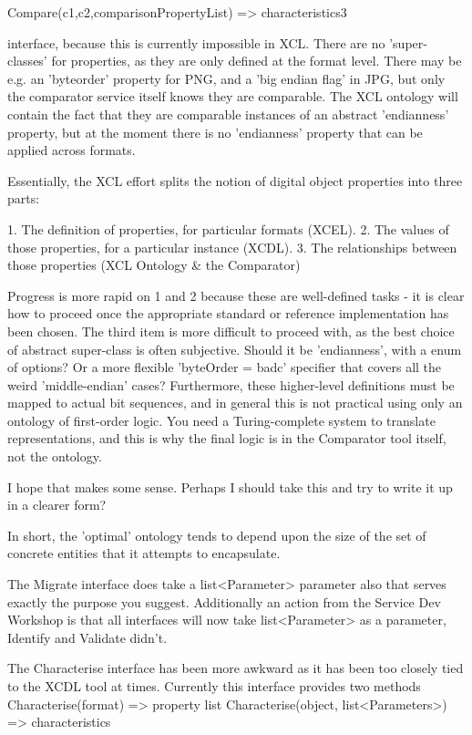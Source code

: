 \documentclass{article}
\begin{document}
Compare(c1,c2,comparisonPropertyList) => characteristics3

interface, because this is currently impossible in XCL.  There are no
'super-classes' for properties, as they are only defined at the format level.
There may be e.g. an 'byteorder' property for PNG, and a 'big endian flag' in
JPG, but only the comparator service itself knows they are comparable.  The XCL
ontology will contain the fact that they are comparable instances of an abstract
'endianness' property, but at the moment there is no 'endianness' property that
can be applied across formats.

Essentially, the XCL effort splits the notion of digital object properties into
three parts:

1. The definition of properties, for particular formats (XCEL). 2. The values of
those properties, for a particular instance (XCDL). 3. The relationships between
those properties (XCL Ontology \& the Comparator)

Progress is more rapid on 1 and 2 because these are well-defined tasks - it is
clear how to proceed once the appropriate standard or reference implementation
has been chosen.  The third item is more difficult to proceed with, as the best
choice of abstract super-class is often subjective.  Should it be 'endianness',
with a enum of options?  Or a more flexible 'byteOrder = badc' specifier that
covers all the weird 'middle-endian' cases?  Furthermore, these higher-level
definitions must be mapped to actual bit sequences, and in general this is not
practical using only an ontology of first-order logic.  You need a
Turing-complete system to translate representations, and this is why the final
logic is in the Comparator tool itself, not the ontology.

I hope that makes some sense.  Perhaps I should take this and try to write it up
in a clearer form?

In short, the 'optimal' ontology tends to depend upon the size of the set of
concrete entities that it attempts to encapsulate.





The Migrate interface does take a list<Parameter> parameter also that serves
exactly the purpose you suggest.  Additionally an action from the Service Dev
Workshop is that all interfaces will now take list<Parameter> as a parameter,
Identify and Validate didn't.

The Characterise interface has been more awkward as it has been too closely tied
to the XCDL tool at times.  Currently this interface provides two methods
Characterise(format) => property list Characterise(object, list<Parameters>) =>
characteristics
\end{document}
